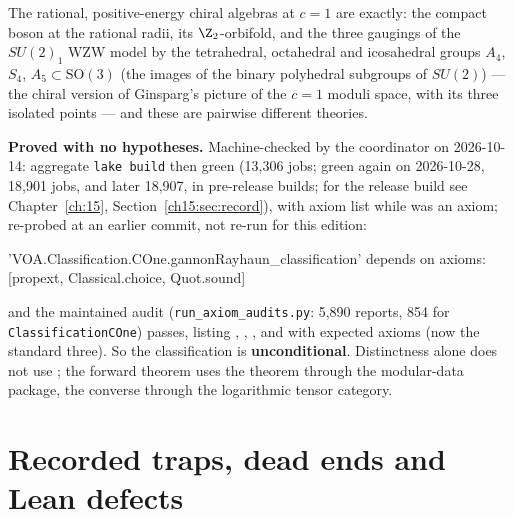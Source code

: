 \begin{physics}
The rational, positive-energy chiral algebras at $c=1$ are exactly: the compact boson at the rational radii, its
$\Z_2$-orbifold, and the three gaugings of the $SU(2)_1$ WZW model by the tetrahedral, octahedral and icosahedral groups
$A_4$, $S_4$, $A_5\subset\mathrm{SO}(3)$ (the images of the binary polyhedral subgroups of $SU(2)$) --- the chiral version of Ginsparg's picture of the $c=1$ moduli space, with its three isolated
points --- and these are pairwise different theories.
\end{physics}

\begin{status}
\textbf{Proved with no hypotheses.} Machine-checked by the coordinator on 2026-10-14: aggregate \texttt{lake build}
then green (13,306 jobs; green again on 2026-10-28, 18{,}901 jobs, and later 18{,}907, in pre-release builds; for the release build see Chapter~\ref{ch:15}, Section~\ref{ch15:sec:record}), with axiom list  while  was an
axiom; re-probed at an earlier commit, not re-run for this edition:
\begin{plaincode}
'VOA.Classification.COne.gannonRayhaun_classification' depends on axioms:
  [propext, Classical.choice, Quot.sound]
\end{plaincode}
and the maintained audit (\texttt{run\_axiom\_audits.py}: 5,890 reports, 854 for \texttt{ClassificationCOne}) passes,
listing , , ,
 and  with expected axioms
 (now the standard three). So the classification is \textbf{unconditional}. Distinctness alone does
not use ; the forward theorem uses the theorem  through the modular-data package, the
converse through the logarithmic tensor category.
\end{status}

\section{Recorded traps, dead ends and Lean defects}\label{l22:sec:defects}

